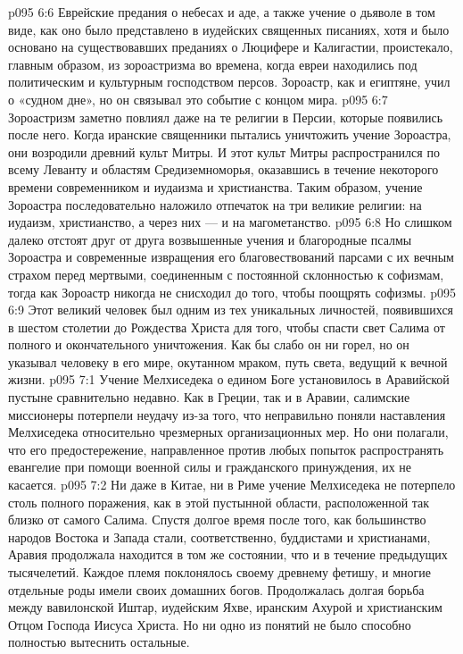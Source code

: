 \vs p095 6:6 Еврейские предания о небесах и аде, а также учение о дьяволе в том виде, как оно было представлено в иудейских священных писаниях, хотя и было основано на существовавших преданиях о Люцифере и Калигастии, проистекало, главным образом, из зороастризма во времена, когда евреи находились под политическим и культурным господством персов. Зороастр, как и египтяне, учил о «судном дне», но он связывал это событие с концом мира.
\vs p095 6:7 Зороастризм заметно повлиял даже на те религии в Персии, которые появились после него. Когда иранские священники пытались уничтожить учение Зороастра, они возродили древний культ Митры. И этот культ Митры распространился по всему Леванту и областям Средиземноморья, оказавшись в течение некоторого времени современником и иудаизма и христианства. Таким образом, учение Зороастра последовательно наложило отпечаток на три великие религии: на иудаизм, христианство, а через них --- и на магометанство.
\vs p095 6:8 \pc Но слишком далеко отстоят друг от друга возвышенные учения и благородные псалмы Зороастра и современные извращения его благовествований парсами с их вечным страхом перед мертвыми, соединенным с постоянной склонностью к софизмам, тогда как Зороастр никогда не снисходил до того, чтобы поощрять софизмы.
\vs p095 6:9 Этот великий человек был одним из тех уникальных личностей, появившихся в шестом столетии до Рождества Христа для того, чтобы спасти свет Салима от полного и окончательного уничтожения. Как бы слабо он ни горел, но он указывал человеку в его мире, окутанном мраком, путь света, ведущий к вечной жизни.
\vs p095 7:1 Учение Мелхиседека о едином Боге установилось в Аравийской пустыне сравнительно недавно. Как в Греции, так и в Аравии, салимские миссионеры потерпели неудачу из\hyp{}за того, что неправильно поняли наставления Мелхиседека относительно чрезмерных организационных мер. Но они полагали, что его предостережение, направленное против любых попыток распространять евангелие при помощи военной силы и гражданского принуждения, их не касается.
\vs p095 7:2 Ни даже в Китае, ни в Риме учение Мелхиседека не потерпело столь полного поражения, как в этой пустынной области, расположенной так близко от самого Салима. Спустя долгое время после того, как большинство народов Востока и Запада стали, соответственно, буддистами и христианами, Аравия продолжала находится в том же состоянии, что и в течение предыдущих тысячелетий. Каждое племя поклонялось своему древнему фетишу, и многие отдельные роды имели своих домашних богов. Продолжалась долгая борьба между вавилонской Иштар, иудейским Яхве, иранским Ахурой и христианским Отцом Господа Иисуса Христа. Но ни одно из понятий не было способно полностью вытеснить остальные.
